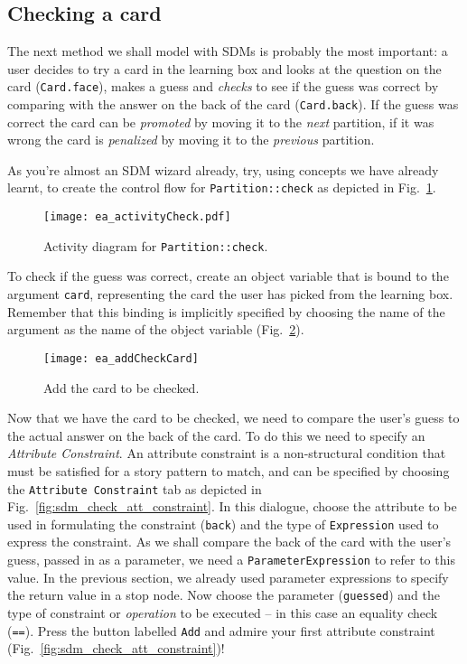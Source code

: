 \subsection{Checking a card}

The next method we shall model with SDMs is probably the most important: a user decides to try a card in the learning box and looks at the question on the card
(\texttt{Card.face}), makes a guess and \emph{checks} to see if the guess was correct by comparing with the answer on the back of the card (\texttt{Card.back}).
If the guess was correct the card can be \emph{promoted} by moving it to the \emph{next} partition, if it was wrong the card is \emph{penalized} by moving it to
the \emph{previous} partition.

As you're almost an SDM wizard already, try, using concepts we have already learnt, to create the control flow for \texttt{Partition::check} as depicted in
Fig.~\ref{fig:sdm_check_start}.

\begin{figure}[htbp]
\begin{center}
  \texttt{[image: ea\_activityCheck.pdf]}
  \caption{Activity diagram for \texttt{Partition::check}.}
  \label{fig:sdm_check_start}
\end{center}
\end{figure}

To check if the guess was correct, create an object variable that is bound to the argument \texttt{card}, representing the card the user has picked from the
learning box. Remember that this binding is implicitly specified by choosing the name of the argument as the name of the object variable 
(Fig.~\ref{fig:sdm_check_addCard}).

\begin{figure}[htbp]
\begin{center}
  \texttt{[image: ea\_addCheckCard]}
  \caption{Add the card to be checked.}
  \label{fig:sdm_check_addCard}
\end{center}
\end{figure}

Now that we have the card to be checked, we need to compare the user's guess to the actual answer on the back of the card. To do this
we need to specify an \emph{Attribute Constraint}. An attribute constraint is a non-structural condition that must be satisfied for a story pattern to match,
and can be specified by choosing the \texttt{Attribute Constraint} tab as depicted in Fig.~\ref{fig:sdm_check_att_constraint}. In this dialogue, choose the
attribute to be used in formulating the constraint (\texttt{back}) and the type of \texttt{Expression} used to express the constraint. As we shall compare the
back of the card with the user's guess, passed in as a parameter, we need a \texttt{ParameterExpression} to refer to this value.
In the previous section, we already used parameter expressions to specify the return value in a stop node. Now choose the parameter (\texttt{guessed}) and the
type of constraint or \emph{operation} to be executed -- in this case an equality check (\texttt{==}). Press the button labelled \texttt{Add} and admire your
first attribute constraint (Fig.~\ref{fig:sdm_check_att_constraint})!

